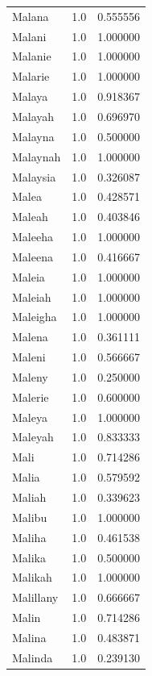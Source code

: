 \documentclass[
  letterpaper,
  DIV=11,
  numbers=noendperiod]{scrreprt}
\begin{document}
\begin{tabular}{lrr}
Malana          &   1.0 &   0.555556 \\
Malani          &   1.0 &   1.000000 \\
Malanie         &   1.0 &   1.000000 \\
Malarie         &   1.0 &   1.000000 \\
Malaya          &   1.0 &   0.918367 \\
Malayah         &   1.0 &   0.696970 \\
Malayna         &   1.0 &   0.500000 \\
Malaynah        &   1.0 &   1.000000 \\
Malaysia        &   1.0 &   0.326087 \\
Malea           &   1.0 &   0.428571 \\
Maleah          &   1.0 &   0.403846 \\
Maleeha         &   1.0 &   1.000000 \\
Maleena         &   1.0 &   0.416667 \\
Maleia          &   1.0 &   1.000000 \\
Maleiah         &   1.0 &   1.000000 \\
Maleigha        &   1.0 &   1.000000 \\
Malena          &   1.0 &   0.361111 \\
Maleni          &   1.0 &   0.566667 \\
Maleny          &   1.0 &   0.250000 \\
Malerie         &   1.0 &   0.600000 \\
Maleya          &   1.0 &   1.000000 \\
Maleyah         &   1.0 &   0.833333 \\
Mali            &   1.0 &   0.714286 \\
Malia           &   1.0 &   0.579592 \\
Maliah          &   1.0 &   0.339623 \\
Malibu          &   1.0 &   1.000000 \\
Maliha          &   1.0 &   0.461538 \\
Malika          &   1.0 &   0.500000 \\
Malikah         &   1.0 &   1.000000 \\
Malillany       &   1.0 &   0.666667 \\
Malin           &   1.0 &   0.714286 \\
Malina          &   1.0 &   0.483871 \\
Malinda         &   1.0 &   0.239130 \\

\end{tabular}
\end{document}
